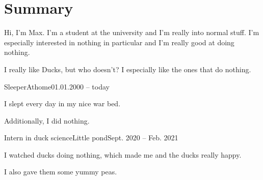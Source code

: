 \documentclass[a4paper,11pt,color,coloraccent=darkmaroon]{awesomecv}
\author{Max Dude}
\begin{document}
	\maketitle

	\begin{infos}
		\hfill%
		\hfill%
		\address{12345, Atmyhome}\par%
		\hfill%
		\hfill%
	\end{infos}

	\section*{Summary}
	Hi, I'm Max. I'm a student at the university and I'm really into normal stuff.
	I'm especially interested in nothing in particular and I'm really good at doing
	nothing.\par
	I really like Ducks, but who doesn't? I especially like the ones that do nothing.

	\begin{education}
	\end{education}

	\begin{experience}
		\begin{entry}{Sleeper}{Athome}{01.01.2000 -- today}
			\item I slept every day in my nice war bed.
			\item Additionally, I did nothing.
		\end{entry}
		\begin{entry}{Intern in duck science}{Little pond}{Sept. 2020 -- Feb. 2021}
			\item I watched ducks doing nothing, which made me and the ducks really happy.
			\item I also gave them some yummy peas.
		\end{entry}
	\end{experience}

	\begin{publications}
	\end{publications}
\end{document}
